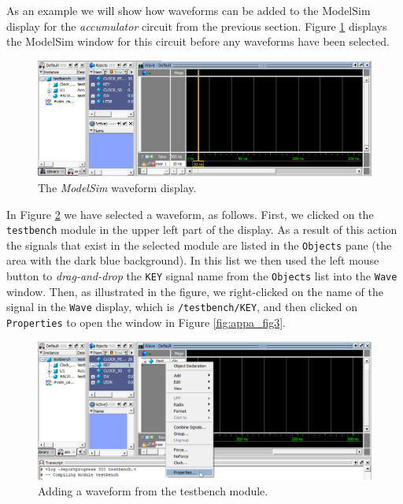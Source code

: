 \documentclass[11pt, twoside, pdftex]{article}
\begin{document}
As an example we will show how waveforms can be added to the ModelSim display for the
{\it accumulator} circuit from the previous section. Figure \ref{fig:appa_fig1} displays the 
ModelSim window for this circuit before any waveforms have been selected.

\begin{figure}[h]
	\begin{center}
		\includegraphics[width = \textwidth]{figures/appa_fig1.png}
	\end{center}
		  \caption{The {\it ModelSim} waveform display.}
	\label{fig:appa_fig1}
\end{figure}

\noindent
In Figure \ref{fig:appa_fig2} we have selected a waveform, as follows. First, we clicked
on the \texttt{testbench} module in the upper left part of the display. As a result of
this action the signals that exist in the selected module are listed in the \texttt{Objects}
pane (the area with the dark blue background). In this list we then used the 
left mouse button to {\it drag-and-drop} the \texttt{KEY} signal name from the 
\texttt{Objects} list into the \texttt{Wave} window. Then, as illustrated in the figure, we 
right-clicked on the name of the signal in the \texttt{Wave} display, which is 
\texttt{/testbench/KEY}, and then clicked on \texttt{Properties} to open the window in 
Figure \ref{fig:appa_fig3}.

\begin{figure}[h]
	\begin{center}
		\includegraphics[width = \textwidth]{figures/appa_fig2.png}
	\end{center}
		  \caption{Adding a waveform from the testbench module.}
	\label{fig:appa_fig2}
\end{figure}
\end{document}
